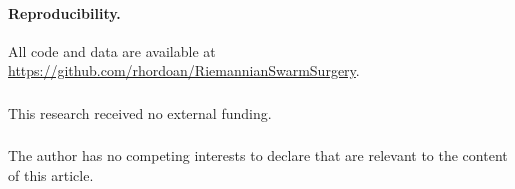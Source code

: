 \documentclass[runningheads]{llncs}
\begin{document}
\paragraph{Reproducibility.} All code and data are available at\\
\url{https://github.com/rhordoan/RiemannianSwarmSurgery}.

\begin{credits}
\subsubsection{\ackname}
This research received no external funding.

\subsubsection{\discintname}
The author has no competing interests to declare that are relevant to the content of this article.
\end{credits}

\end{document}
